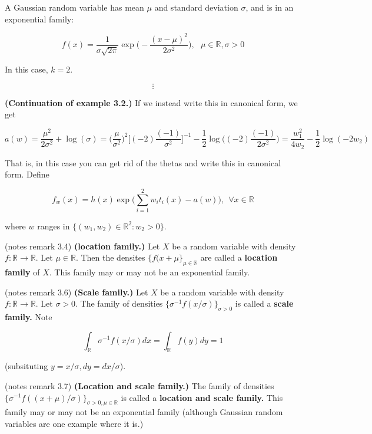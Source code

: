 \begin{example} A Gaussian random variable has mean \(\mu\) and standard deviation \(\sigma\), and is in an exponential family:

\[
f(x) = \frac{1}{\sigma \sqrt{2\pi}} \exp \bigg( - \frac{(x-\mu)^2}{2 \sigma^2} \bigg), \ \ \ \mu \in \mathbb{R}, \sigma > 0
\]

In this case, \(k=2\).

\[
\vdots
\]

\textbf{(Continuation of example 3.2.)} If we instead write this in canonical form, we get

\[
a(w) = \frac{\mu^2}{2\sigma^2} + \log(\sigma) = \bigg( \frac{\mu}{\sigma^2} \bigg) ^2 \bigg[ (-2) \frac{(-1)}{\sigma^2} \bigg] ^ {-1} - \frac{1}{2} \log \bigg( (-2) \frac{(-1)}{2\sigma^2} \bigg)  = \frac{w_1^2}{4w_2} - \frac{1}{2} \log(-2 w_2)
\]

That is, in this case you can get rid of the thetas and write this in canonical form. Define 

\[
f_w(x) = h(x) \exp \bigg( \sum_{i=1}^2 w_i t_i(x) - a (w) \bigg),  \ \ \forall x \in \mathbb{R}
\]

where \(w\) ranges in \(\{ (w_1, w_2) \in \mathbb{R}^2: w_2 > 0   \}\).

\end{example}

\begin{remark} (notes remark 3.4) \textbf{(location family.)} Let \(X\) be a random variable with density \(f: \mathbb{R} \to \mathbb{R}\). Let \(\mu \in \mathbb{R}\). Then the densites \(\{f(x+ \mu\}_{\mu \in \mathbb{R}}\) are called a \textbf{location family} of \(X\). This family may or may not be an exponential family.

\end{remark}

\begin{remark} (notes remark 3.6) \textbf{(Scale family.)} Let \(X\) be a random variable with density \(f: \mathbb{R} \to \mathbb{R}\). Let \(\sigma > 0\). The family of densities  \( \{ \sigma^{-1} f(x/\sigma) \}_{\sigma > 0}\) is called a \textbf{scale family.} Note 

\[
\int_{\mathbb{R}} \sigma^{-1}f(x/\sigma) dx = \int_{\mathbb{R}} f(y) dy = 1
\]

(subsituting \(y = x/\sigma, dy = dx/\sigma\)).

\end{remark}

\begin{remark} (notes remark 3.7) \textbf{(Location and scale family.)} The family of densities  \( \{ \sigma^{-1} f((x+\mu)/\sigma) \}_{\sigma > 0, \mu \in \mathbb{R}}\) is called a \textbf{location and scale family.} This family may or may not be an exponential family (although Gaussian random variables are one example where it is.)

\end{remark}

